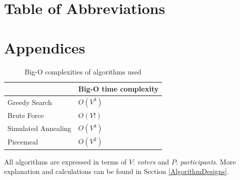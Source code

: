 \documentclass[12pt]{report}
\begin{document}
\section*{Table of Abbreviations}

\section*{Appendices}

\begin{table}[H]
\centering
\caption{Big-O complexities of algorithms used}
\label{bigO}
\begin{tabular}{|l|l|}
\hline
        & Big-O time complexity \\ \hline
Greedy Search & $O(V^3)$ \\ \hline
Brute Force & $O(V!)$ \\ \hline
Simulated Annealing & $O(V^4)$ \\ \hline
Piecemeal & $O(V^2)$ \\ \hline
\end{tabular}
\end{table}
All algorithms are expressed in terms of $V$: \textit{voters} and $P$: \textit{participants}. More explanation and calculations can be found in Section \ref{AlgorithmDesigns}.

\clearpage
\renewcommand{\bibsection}{\section*{References}}
{}

\end{document}
